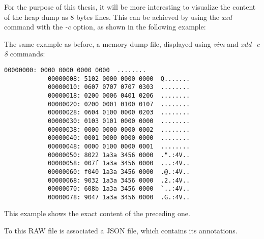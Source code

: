     For the purpose of this thesis, it will be more interesting to visualize the content of the heap dump as 8 bytes lines. This can be achieved by using the \textit{xxd} command with the \textit{-c} option, as shown in the following example:

    \begin{minipage}{\dimexpr\linewidth-20pt}
        The same example as before, a memory dump file, displayed using \textit{vim} and \textit{xdd -c 8} commands:

        \begin{lstlisting}[style=hexdump, caption={8 bytes per line visualization of a Hex Dump from \textit{Training/basic/V\_7\_8\_P1/16/5070-1643978841-heap.raw}}, label={lst:hexdump-8bytes}]
            00000000: 0000 0000 0000 0000  ........
            00000008: 5102 0000 0000 0000  Q.......
            00000010: 0607 0707 0707 0303  ........
            00000018: 0200 0006 0401 0206  ........
            00000020: 0200 0001 0100 0107  ........
            00000028: 0604 0100 0000 0203  ........
            00000030: 0103 0101 0000 0000  ........
            00000038: 0000 0000 0000 0002  ........
            00000040: 0001 0000 0000 0000  ........
            00000048: 0000 0100 0000 0001  ........
            00000050: 8022 1a3a 3456 0000  .".:4V..
            00000058: 007f 1a3a 3456 0000  ...:4V..
            00000060: f040 1a3a 3456 0000  .@.:4V..
            00000068: 9032 1a3a 3456 0000  .2.:4V..
            00000070: 608b 1a3a 3456 0000  `..:4V..
            00000078: 9047 1a3a 3456 0000  .G.:4V..
        \end{lstlisting}
    \end{minipage}

    This example shows the exact content of the preceding one. 

    To this RAW file is associated a JSON file, which contains its annotations.  

